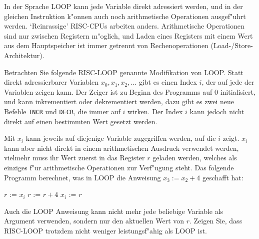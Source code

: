 In der Sprache LOOP kann jede Variable direkt adressiert werden, und
in der gleichen Instruktion k"onnen auch noch arithmetische Operationen
ausgef"uhrt werden. `Reinrassige' RISC-CPUs arbeiten anders.
Arithmetische Operationen sind nur zwischen Registern m"oglich,
und Laden eines Registers mit einem Wert aus dem Hauptspeicher ist
immer getrennt von Rechenoperationen (Load-/Store-Architektur).

Betrachten Sie folgende RISC-LOOP genannte Modifikation von LOOP.
Statt direkt adressierbarer Variablen
$x_0,x_1,x_2,\dots$ gibt es einen Index $i$, der auf jede der Variablen zeigen
kann. Der Zeiger ist zu Beginn des Programms auf $0$ initialisiert, und kann
inkrementiert oder dekrementiert werden, dazu gibt
es zwei neue Befehle {\tt INCR} und {\tt DECR}, die immer auf $i$
wirken.
Der Index $i$ kann jedoch nicht direkt auf einen bestimmten Wert gesetzt werden.

Mit $x_i$
kann jeweils auf diejenige Variable zugegriffen werden, auf die $i$ zeigt.
$x_i$ kann aber nicht direkt in einem arithmetischen Ausdruck verwendet werden,
vielmehr muss ihr Wert zuerst in das Register $r$ geladen werden, welches
als einziges f"ur arithmetische Operationen zur Verf"ugung steht. Das folgende
Programm berechnet, was in LOOP die Anweisung $x_3 := x_2 + 4$
geschafft hat:
\begin{algorithmic}[1]
\STATE $r$ := $x_i$
\STATE $r$ := $r + 4$
\STATE $x_i$ := $r$
\end{algorithmic}
Auch die LOOP Anweisung kann nicht mehr jede beliebige Variable als
Argument verwenden, sondern nur den aktuellen Wert von $r$.
Zeigen Sie, dass RISC-LOOP trotzdem nicht weniger leistungsf"ahig als
LOOP ist.

